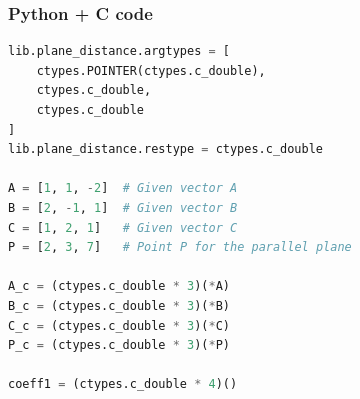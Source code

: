 \documentclass{beamer}
\begin{document}
\begin{frame}[fragile]
    \frametitle{Python + C code}

    \begin{lstlisting}[language=Python]
lib.plane_distance.argtypes = [
    ctypes.POINTER(ctypes.c_double),
    ctypes.c_double,
    ctypes.c_double
]
lib.plane_distance.restype = ctypes.c_double

A = [1, 1, -2]  # Given vector A
B = [2, -1, 1]  # Given vector B
C = [1, 2, 1]   # Given vector C
P = [2, 3, 7]   # Point P for the parallel plane

A_c = (ctypes.c_double * 3)(*A)
B_c = (ctypes.c_double * 3)(*B)
C_c = (ctypes.c_double * 3)(*C)
P_c = (ctypes.c_double * 3)(*P)

coeff1 = (ctypes.c_double * 4)()
    \end{lstlisting}
\end{frame}
\end{document}
